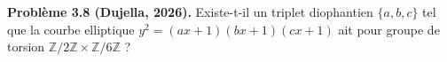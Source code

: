 \textbf{Problème 3.8 (Dujella, 2026).} Existe-t-il un triplet diophantien $\{a,b,c\}$ tel que la courbe elliptique $y^2=(ax+1)(bx+1)(cx+1)$ ait pour groupe de torsion $\mathbb{Z}/2\mathbb{Z}\times\mathbb{Z}/6\mathbb{Z}$ ?

